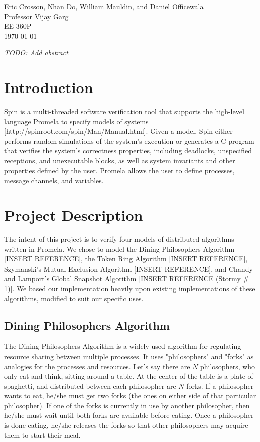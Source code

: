 \documentclass[12pt]{article}
\begin{document}
\begin{flushleft}
Eric Crosson, Nhan Do, William Mauldin, and Daniel Officewala \\
Professor Vijay Garg\\
EE 360P \\
\today \\

\begin{center}
\emph{TODO: Add abstract}
\end{center}

\setlength{\parindent}{0.5in}
\section{Introduction}
Spin is a multi-threaded software verification tool that supports the high-level language Promela to specify models of systems [http://spinroot.com/spin/Man/Manual.html]. Given a model, Spin either performs random simulations of the system's execution or generates a C program that verifies the system's correctness properties, including deadlocks, unspecified receptions, and unexecutable blocks, as well as system invariants and other properties defined by the user. Promela allows the user to define processes, message channels, and variables.

\section{Project Description}
The intent of this project is to verify four models of distributed algorithms written in Promela. We chose to model the Dining Philosophers Algorithm [INSERT REFERENCE], the Token Ring Algorithm [INSERT REFERENCE], Szymanski's Mutual Exclusion Algorithm [INSERT REFERENCE], and Chandy and Lamport's Global Snapshot Algorithm [INSERT REFERENCE (Stormy \# 1)]. We based our implementation heavily upon existing implementations of these algorithms, modified to suit our specific uses.

\subsection{Dining Philosophers Algorithm}
The Dining Philosophers Algorithm is a widely used algorithm for regulating resource sharing between multiple processes. It uses "philosophers" and "forks" as analogies for the processes and resources. Let’s say there are $N$ philosophers, who only eat and think, sitting around a table. At the center of the table is a plate of spaghetti, and distributed between each philosopher are $N$ forks. If a philosopher wants to eat, he/she must get two forks (the ones on either side of that particular philosopher). If one of the forks is currently in use by another philosopher, then he/she must wait until both forks are available before eating. Once a philosopher is done eating, he/she releases the forks so that other philosophers may acquire them to start their meal.


\end{flushleft}
\end{document}
